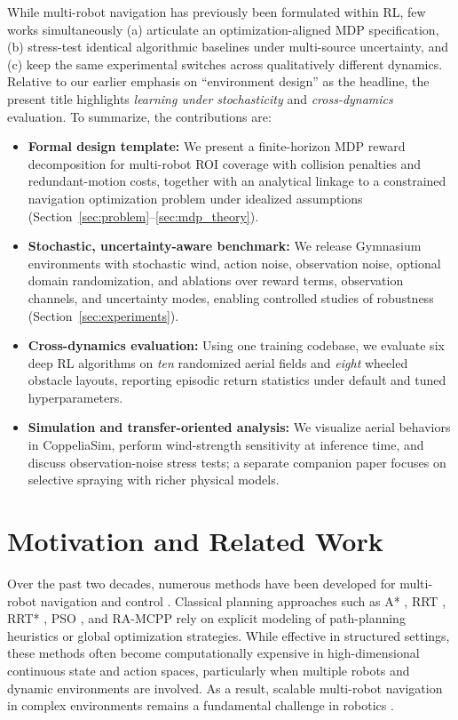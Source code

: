 \documentclass{article}
\begin{document}
While multi-robot navigation has previously been formulated within RL, few works simultaneously (a) articulate an optimization-aligned MDP specification, (b) stress-test identical algorithmic baselines under multi-source uncertainty, and (c) keep the same experimental switches across qualitatively different dynamics. Relative to our earlier emphasis on ``environment design'' as the headline, the present title highlights \emph{learning under stochasticity} and \emph{cross-dynamics} evaluation. To summarize, the contributions are:
\begin{itemize}
    \item \textbf{Formal design template:} We present a finite-horizon MDP reward decomposition for multi-robot ROI coverage with collision penalties and redundant-motion costs, together with an analytical linkage to a constrained navigation optimization problem under idealized assumptions (Section~\ref{sec:problem}--\ref{sec:mdp_theory}).
    \item \textbf{Stochastic, uncertainty-aware benchmark:} We release Gymnasium environments with stochastic wind, action noise, observation noise, optional domain randomization, and ablations over reward terms, observation channels, and uncertainty modes, enabling controlled studies of robustness (Section~\ref{sec:experiments}).
    \item \textbf{Cross-dynamics evaluation:} Using one training codebase, we evaluate six deep RL algorithms on \emph{ten} randomized aerial fields and \emph{eight} wheeled obstacle layouts, reporting episodic return statistics under default and tuned hyperparameters.
    \item \textbf{Simulation and transfer-oriented analysis:} We visualize aerial behaviors in CoppeliaSim, perform wind-strength sensitivity at inference time, and discuss observation-noise stress tests; a separate companion paper focuses on selective spraying with richer physical models.
\end{itemize}

\section{Motivation and Related Work}
\label{sec:related}
Over the past two decades, numerous methods have been developed for multi-robot navigation and control \citep{nafis2021, sam2005, mickey2021}. Classical planning approaches such as A* \citep{goto2003}, RRT \citep{rodriguez2006rrt}, RRT* \citep{karaman2011rrts}, PSO \citep{nafis2021}, and RA-MCPP \citep{mickey2021} rely on explicit modeling of path-planning heuristics or global optimization strategies. While effective in structured settings, these methods often become computationally expensive in high-dimensional continuous state and action spaces, particularly when multiple robots and dynamic environments are involved. As a result, scalable multi-robot navigation in complex environments remains a fundamental challenge in robotics \citep{Sunderhauf2018ijrr, ibarz2021ijrr, zhang2023multi, cai2022multi, osooli2024multi}.
\end{document}
